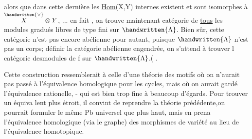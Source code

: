 alors que dans cette dernière les \uline{Hom}(X,Y) internes existent et
 sont isomorphes à $\overset{\handwritten{\vee}}{X}\otimes Y$, ... en fait , on trouve maintenant
catégorie de \uline{tous} les modules gradués libres de type fini sur $\handwritten{\Lambda}$.
Bien sûr, cette catégorie n'est pas encore abélienne pour autant,
puisque $\handwritten{\Lambda}$ n'est pas un corps;   définir la catégorie abélienne
engendrée, on s'attend à trouver l catégorie desmodules de   f
sur $\handwritten{\Lambda}$.(  .

Cette construction ressemblerait à celle d'une théorie des
motifs où on n'aurait pas passé à l'équivalence homologique pour
les cycles, mais où on aurait gardé l'équivalence rationelle, - qui
est bien trop fine à beaucoup d'égards. Pour trouver un équiva
lent plus étroit, il convint de reprendre la théorie prédédente,on
pourrait formuler le même Pb universel que plus haut, mais en prena
l'équivalence homologique (via le graphe) des morphismes de variété
au lieu de l'équivalence homotopique. 



